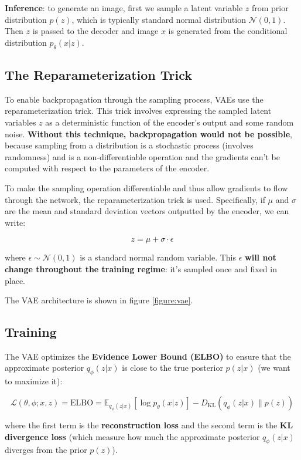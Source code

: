 \textbf{Inference}: to generate an image, first we sample a latent variable $z$ from prior distribution $p(z)$, which is typically standard normal distribution $\mathcal{N}(0, 1)$. Then $z$ is passed to the decoder and image $x$ is generated from the conditional distribution $p_\theta (x|z)$. 





\subsection{The Reparameterization Trick}

To enable backpropagation through the sampling process, VAEs use the reparameterization trick. This trick involves expressing the sampled latent variables $z$ as a deterministic function of the encoder's output and some random noise. \textbf{Without this technique, backpropagation would not be possible}, because sampling from a distribution is a stochastic process (involves randomness) and is a non-differentiable operation and the gradients can't be computed with respect to the parameters of the encoder. 

To make the sampling operation differentiable and thus allow gradients to flow through the network, the reparameterization trick is used. Specifically, if $\mu$ and $\sigma$ are the mean and standard deviation vectors outputted by the encoder, we can write:

\begin{equation*}
    z = \mu + \sigma \cdot \epsilon
\end{equation*}

where $\epsilon \sim \mathcal{N}(0, 1)$ is a standard normal random variable. This $\epsilon$ \textbf{will not change throughout the training regime}: it's sampled once and fixed in place.



The VAE architecture is shown in figure \ref{figure:vae}.

\subsection{Training}

The VAE optimizes the \textbf{Evidence Lower Bound (ELBO)} to ensure that the approximate posterior $q_\phi (z|x)$ is close to the true posterior $p(z|x)$ (we want to maximize it):

\begin{equation}
    \mathcal{L}(\theta, \phi; x, z) = \text{ELBO} = \mathbb{E}_{q_\phi(z|x)} \left[ \log p_\theta(x|z) \right] - D_\text{KL}(q_\phi(z|x) \| p(z))
    \label{eq:vae_elbo}
\end{equation}

where the first term is the \textbf{reconstruction loss} and the second term is the \textbf{KL divergence loss} (which measure how much the approximate posterior $q_\phi (z|x)$ diverges from the prior $p(z)$). 
